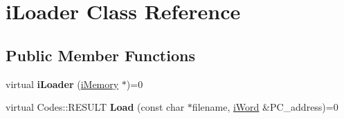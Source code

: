 \hypertarget{classiLoader}{
\section{iLoader Class Reference}
\label{classiLoader}
}
\subsection*{Public Member Functions}
\begin{DoxyCompactItemize}
\item 
\hypertarget{classiLoader_af176ab81c798d222d0bd533b0ce902e8}{
virtual {\bfseries iLoader} (\hyperlink{classiMemory}{iMemory} $\ast$)=0}
\label{classiLoader_af176ab81c798d222d0bd533b0ce902e8}

\item 
\hypertarget{classiLoader_abc5e510d785dae098511075bb683b273}{
virtual Codes::RESULT {\bfseries Load} (const char $\ast$filename, \hyperlink{classiWord}{iWord} \&PC\_\-address)=0}
\label{classiLoader_abc5e510d785dae098511075bb683b273}

\end{DoxyCompactItemize}
